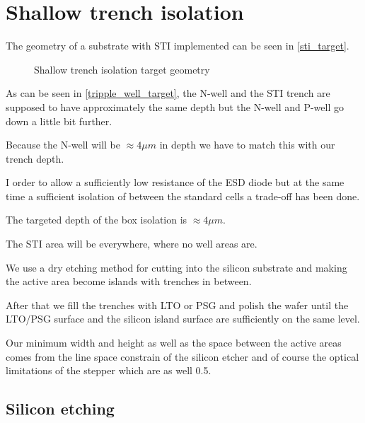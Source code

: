 \section{Shallow trench isolation}\label{sti_chapter}
The geometry of a substrate with STI implemented can be seen in \autoref{sti_target}.

\begin{figure}[H]
	\centering
	\begin{tikzpicture}[node distance = 3cm, auto, thick,scale=\CrossAndTopSectionBig, every node/.style={transform shape}]
		
	\end{tikzpicture}
	\begin{tikzpicture}[node distance = 3cm, auto, thick,scale=\CrossAndTopSectionBig, every node/.style={transform shape}]
		
	\end{tikzpicture}
	\caption{Shallow trench isolation target geometry}
	\label{sti_target}
\end{figure}

As can be seen in \autoref{tripple_well_target}, the N-well and the STI trench are supposed to have approximately the same depth but the N-well and P-well go down a little bit further.

Because the N-well will be $\approx 4 \mu m$ in depth we have to match this with our trench depth.

I order to allow a sufficiently low resistance of the ESD diode but at the same time a sufficient isolation of between the standard cells a trade-off has been done.

The targeted depth of the box isolation is $\approx 4 \mu m$.

The STI area will be everywhere, where no well areas are.

We use a dry etching method for cutting into the silicon substrate and making the active area become islands with trenches in between.

After that we fill the trenches with LTO or PSG and polish the wafer until the LTO/PSG surface and the silicon island surface are sufficiently on the same level.

Our minimum width and height as well as the space between the active areas comes from the line space constrain of the silicon etcher and of course the optical limitations of the stepper which are as well 0.5\um.

\newpage

\subsection{Silicon etching}\label{sti_trench_etch}

